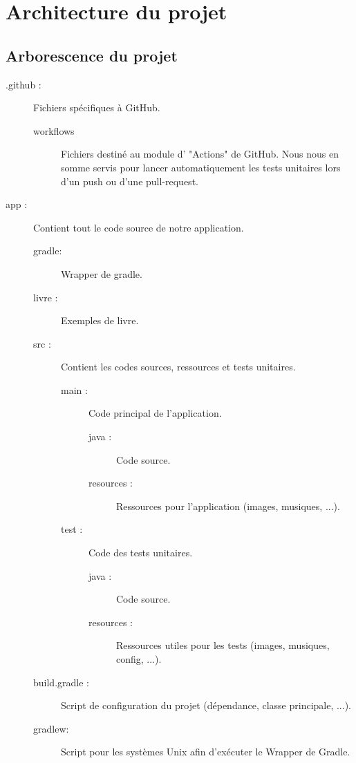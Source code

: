 \chapter{Architecture du projet}

	\section{Arborescence du projet}

		\begin{description}
			\item[.github :]{Fichiers spécifiques à GitHub.}
			\begin{description}
				\item[workflows]{Fichiers destiné au module d' "Actions" de GitHub. Nous nous en somme servis pour lancer automatiquement les tests unitaires lors d'un push ou d'une pull-request.}
			\end{description}
			\item[app :]{Contient tout le code source de notre application.}
			\begin{description}
				\item[gradle:]{Wrapper de gradle.}
				\item[livre :]{Exemples de livre.}
				\item[src :]{Contient les codes sources, ressources et tests unitaires.}
				\begin{description}
					\item[main :]{Code principal de l'application.}
					\begin{description}
						\item[java :]{Code source.}
						\item[resources :]{Ressources pour l'application (images, musiques, ...).}
					\end{description}
					\item[test :]{Code des tests unitaires.}
					\begin{description}
						\item[java :]{Code source.}
						\item[resources :]{Ressources utiles pour les tests (images, musiques, config, ...).}
					\end{description}
				\end{description}
				\item[build.gradle :]{Script de configuration du projet (dépendance, classe principale, ...).}
				\item[gradlew:]{Script pour les systèmes Unix afin d'exécuter le Wrapper de Gradle.}

\end{description}
\end{description}
